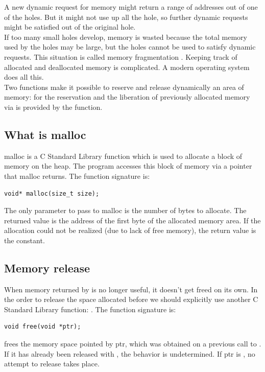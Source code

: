 A new dynamic request for memory might return a range of addresses out of one of the holes. But it might not use up all the hole, so further dynamic requests might be satisfied out of the original hole.\\

If too many small holes develop, memory is wasted because the total memory used by the holes may be large, but the holes cannot be used to satisfy dynamic requests. This situation is called memory fragmentation \cite{Knuth73a}. Keeping track of allocated and deallocated memory is complicated. A modern operating system does all this.\\

Two functions make it possible to reserve and release dynamically an area of memory:  for the reservation and the liberation of previously allocated memory via  is provided by the  function.

\subsection{What is malloc}
malloc is a C Standard Library function which is used to allocate a block of memory on the heap. The program accesses this block of memory via a pointer that malloc returns.
The function signature is:
\begin{lstlisting}
void* malloc(size_t size);
\end{lstlisting}

The only parameter to pass to malloc is the number of bytes to allocate. The returned value is the address of the first byte of the allocated memory area. If the allocation could not be realized (due to lack of free memory), the return value is the  constant.

\subsection{Memory release}
When memory returned by  is no longer useful, it doesn't get freed on its own. In the order to release the space allocated before we should explicitly use another C Standard Library function:  .
The function signature is:
\begin{lstlisting}
void free(void *ptr);
\end{lstlisting}
 frees the memory space pointed by ptr, which was obtained on a previous call to . If it has already been released with , the behavior is undetermined. If ptr is , no attempt to release takes place.

